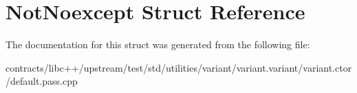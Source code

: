 \hypertarget{struct_not_noexcept}{}\section{Not\+Noexcept Struct Reference}
\label{struct_not_noexcept}


The documentation for this struct was generated from the following file\+:\begin{DoxyCompactItemize}
\item 
contracts/libc++/upstream/test/std/utilities/variant/variant.\+variant/variant.\+ctor/default.\+pass.\+cpp\end{DoxyCompactItemize}
